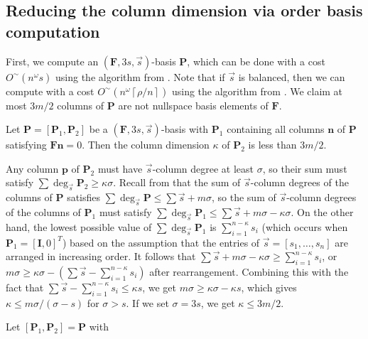 \subsection{\label{sub:continueComputingNullspaceBasisByColumns}Reducing the
column dimension via order basis computation}

First, we compute an $\left(\mathbf{F},3s,\vec{s}\right)$-basis $\mathbf{P}$,
which can be done with a cost $O^{\sim}\left(n^{\omega}s\right)$
using the algorithm from \citet{Giorgi2003}. Note that if $\vec{s}$
is balanced, then we can compute with a cost $O^{\sim}\left(n^{\omega}\left\lceil \rho/n\right\rceil \right)$
using the algorithm from \citet{za2009}. We claim at most $3m/2$
columns of \textbf{$\mathbf{P}$} are not nullspace basis elements
of $\mathbf{F}$.
\begin{lem}
\label{lem:dimensionOfPartialNullspaceBasisBasedOnOrder} Let $\mathbf{P}=[\mathbf{P}_{1},\mathbf{P}_{2}]$
be a $(\mathbf{F},3s,\vec{s})$-basis with $\mathbf{P}_{1}$ containing
all columns $\mathbf{n}$ of $\mathbf{P}$ satisfying $\mathbf{F}\mathbf{n}=0$.
Then the column dimension $\kappa$ of $\mathbf{P}_{2}$ is less than
$3m/2.$\end{lem}
\begin{pf}
Any column $\mathbf{p}$ of $\mathbf{P}_{2}$ must have $\vec{s}$-column
degree at least $\sigma$, so their sum must satisfy $\sum\deg_{\vec{s}}\mathbf{P}_{2}\ge\kappa\sigma$.
Recall from 
that the sum of $\vec{s}$-column degrees of the columns of $\mathbf{P}$
satisfies $\sum\deg_{\vec{s}}\mathbf{P}\le\sum\vec{s}+m\sigma$, so
the sum of $\vec{s}$-column degrees of the columns of $\mathbf{P}_{1}$
must satisfy $\sum\deg_{\vec{s}}\mathbf{P}_{1}\le\sum\vec{s}+m\sigma-\kappa\sigma$.
On the other hand, the lowest possible value of $\sum\deg_{\vec{s}}\mathbf{P}_{1}$
is $\sum_{i=1}^{n-\kappa}s_{i}$ (which occurs when $\mathbf{P}_{1}=\left[\mathbf{I},0\right]^{T}$)
based on the assumption that the entries of $\vec{s}=\left[s_{1},\dots,s_{n}\right]$
are arranged in increasing order. It follows that $\sum\vec{s}+m\sigma-\kappa\sigma\ge\sum_{i=1}^{n-\kappa}s_{i}$,
or $m\sigma\ge\kappa\sigma-\left(\sum\vec{s}-\sum_{i=1}^{n-\kappa}s_{i}\right)$
after rearrangement. Combining this with the fact that $\sum\vec{s}-\sum_{i=1}^{n-\kappa}s_{i}\le\kappa s$,
we get $m\sigma\ge\kappa\sigma-\kappa s$, which gives $\kappa\le m\sigma/(\sigma-s)$
for $\sigma>s$. If we set $\sigma=3s$, we get $\kappa\le3m/2$.
\end{pf}
Let $\left[\mathbf{P}_{1},\mathbf{P}_{2}\right]=\mathbf{P}$ with
